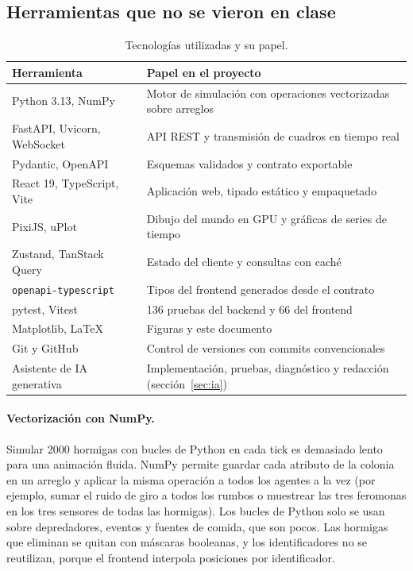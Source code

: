 \documentclass[11pt,a4paper]{article}
\newcommand{\code}[1]{\texttt{\small #1}}
\begin{document}
\subsection{Herramientas que no se vieron en clase}

\begin{table}[H]
\centering
\caption{Tecnologías utilizadas y su papel.}
\label{tab:herramientas}
\begin{tabularx}{\textwidth}{@{}lX@{}}
\toprule
\textbf{Herramienta} & \textbf{Papel en el proyecto} \\
\midrule
Python 3.13, NumPy & Motor de simulación con operaciones vectorizadas sobre arreglos \\
FastAPI, Uvicorn, WebSocket & API REST y transmisión de cuadros en tiempo real \\
Pydantic, OpenAPI & Esquemas validados y contrato exportable \\
React 19, TypeScript, Vite & Aplicación web, tipado estático y empaquetado \\
PixiJS, uPlot & Dibujo del mundo en GPU y gráficas de series de tiempo \\
Zustand, TanStack Query & Estado del cliente y consultas con caché \\
\code{openapi-typescript} & Tipos del frontend generados desde el contrato \\
pytest, Vitest & 136 pruebas del backend y 66 del frontend \\
Matplotlib, \LaTeX & Figuras y este documento \\
Git y GitHub & Control de versiones con commits convencionales \\
Asistente de IA generativa & Implementación, pruebas, diagnóstico y redacción (sección~\ref{sec:ia}) \\
\bottomrule
\end{tabularx}
\end{table}

\paragraph{Vectorización con NumPy.} Simular 2000 hormigas con bucles de Python en cada tick es demasiado lento para una animación fluida. NumPy permite guardar cada atributo de la colonia en un arreglo y aplicar la misma operación a todos los agentes a la vez (por ejemplo, sumar el ruido de giro a todos los rumbos o muestrear las tres feromonas en los tres sensores de todas las hormigas). Los bucles de Python solo se usan sobre depredadores, eventos y fuentes de comida, que son pocos. Las hormigas que eliminan se quitan con máscaras booleanas, y los identificadores no se reutilizan, porque el frontend interpola posiciones por identificador.
\end{document}
